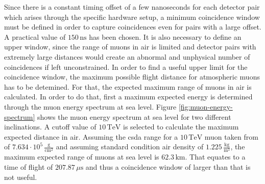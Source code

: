 \documentclass[abstract,toc,los,lof,english,10pt,glossary,acronyms]{jluthesis}
\begin{document}
Since there is a constant timing offset of a few nanoseconds for each detector pair which arises through the specific hardware setup, a minimum coincidence window must be defined in order to capture coincidences even for pairs with a large offset. A practical value of $150\,\text{ns}$ has been chosen.
It is also necessary to define an upper window, since the range of muons in air is limited and detector pairs with extremely large distances would create an abnormal and unphysical number of coincidences if left unconstrained. In order to find a useful upper limit for the coincidence window, the maximum possible flight distance for atmospheric muons has to be detemined. For that, the expected maximum range of muons in air is calculated. In order to do that, first a maximum expected energy is determined through the muon energy spectrum at sea level. Figure \ref{fig:muon-energy-spectrum} shows the muon energy spectrum at sea level for two different inclinations. A cutoff value of $10\,\text{TeV}$ is selected to calculate the maximum expected distance in air. Assuming the \acrfull{csda} range for a $10\,\text{TeV}$ muon taken from \cite{muon-range} of $7.634\cdot10^5\,\frac{\text{g}}{\text{cm}^2}$ and assuming standard condition air density of $1.225\,\frac{\text{kg}}{\text{m}^3}$, the maximum expected range of muons at sea level is $62.3\,\text{km}$. That equates to a time of flight of $207.87\,\mu\text{s}$ and thus a coincidence window of larger than that is not useful.
\end{document}
